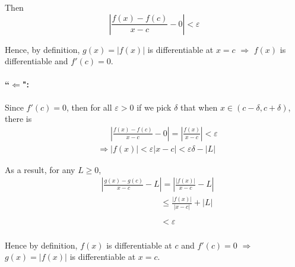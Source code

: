 \documentclass[11pt]{article}
\begin{document}
			Then
			\[\left|\frac{f(x) - f(c)}{x - c} - 0\right| < \varepsilon\]
			
			Hence, by definition, $g(x) = |f(x)|$ is differentiable at $x = c$ $\Rightarrow$ $f(x)$ is differentiable and $f'(c) = 0$.
			
		\paragraph{``$\Leftarrow$":}
			Since $f'(c) = 0$, then for all $\varepsilon > 0$ if we pick $\delta$ that when $x \in (c - \delta, c + \delta)$, there is
			\begin{align}
				&\phantom{\Rightarrow}\left|\frac{f(x) - f(c)}{x - c} - 0\right| = \left|\frac{f(x)}{x - c}\right| < \varepsilon\nonumber\\
				&\Rightarrow |f(x)| < \varepsilon|x - c| < \varepsilon\delta - |L|\nonumber
			\end{align} 
			
			As a result, for any $L \geq 0$, 
			\begin{align}
				&\left|\frac{g(x) - g(c)}{x - c} - L\right| = \left|\frac{|f(x)|}{x - c} - L\right|\nonumber\\
				&\phantom{\phantom{\left|\frac{f(x) - f(c)}{x - c} - 0\right|}} \leq \frac{|f(x)|}{|x - c|} + |L|\nonumber\\
				&\phantom{\phantom{\left|\frac{f(x) - f(c)}{x - c} - 0\right|}} < \varepsilon\nonumber
			\end{align}
			
			Hence by definition, $f(x)$ is differentiable at $c$ and $f'(c) = 0$ $\Rightarrow$ $g(x) = |f(x)|$ is differentiable at $x = c$.
\end{document}

